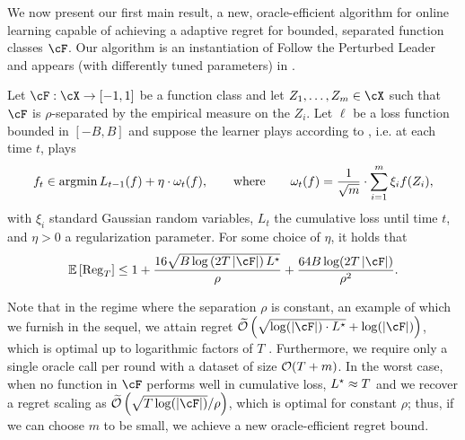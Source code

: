 We now present our first main result, a new, oracle-efficient algorithm for online learning capable of achieving a adaptive regret for bounded, separated function classes $\cF$.  Our algorithm is an instantiation of Follow the Perturbed Leader \citep{kalai2005efficient} and appears (with differently tuned parameters) in \citet{block2022smoothed,block2024oracle}.

\begin{theorem}\label{thm:lstar_online}
    Let $\cF: \cX \to [-1,1]$ be a function class and let $Z_1, \dots, Z_m \in \cX$ such that $\cF$ is $\rho$-separated by the empirical measure on the $Z_i$.  Let $\ell$ be a loss function bounded in $[-B,B]$ and suppose the learner plays according to , i.e. at each time $t$, plays
    \begin{align}\label{eq:ftpl_gaussian}
        f_t \in \operatorname*{argmin} L_{t-1}(f) + \eta \cdot \omega_t(f), \qquad \text{where} \qquad \omega_t(f) = \frac 1{\sqrt m} \cdot \sum_{i = 1}^{m} \xi_i f(Z_i),
    \end{align}
    with $\xi_i$ standard Gaussian random variables, $L_{t}$ the cumulative loss until time $t$, and $\eta > 0$ a regularization parameter.  For some choice of $\eta$, it holds that
    \begin{align}\label{eq:ftpl_gaussian_regret}
        \ee\left[ \reg_T \right] \leq 1 +   \frac{16 \sqrt{B \log\left( 2 T \abs{\cF} \right)\Lstar}}{\rho} + \frac{64B \log(2 T \abs{\cF})}{\rho^2}   .
    \end{align}
\end{theorem}
Note that in the regime where the separation $\rho$ is constant, an example of which we furnish in the sequel, we attain regret $\bigOtil\left( \sqrt{\log(\abs{\cF}) \cdot \Lstar} + \log(\abs{\cF})   \right)$, which is optimal up to logarithmic factors of $T$ \citep{cesa2006prediction}.  Furthermore,  we require only a single oracle call per round with a dataset of size $\mathcal{O}(T + m)$.  In the worst case, when no function in $\cF$ performs well in cumulative loss, $L^\star \approx T$ and we recover a regret scaling as $\bigOtil\left( \sqrt{T \log(\abs{\cF})} / \rho \right)$, which is optimal for constant $\rho$; thus, if we can choose $m$ to be small, we achieve a new oracle-efficient regret bound.

